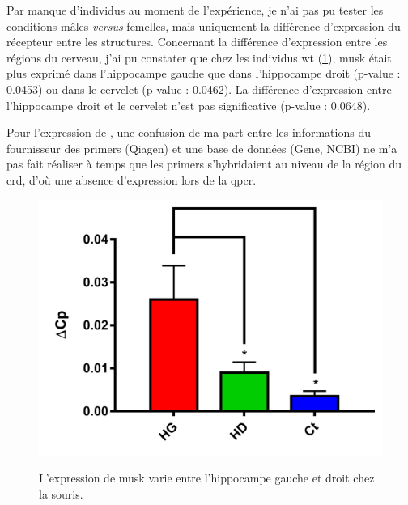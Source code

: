 	Par manque d'individus au moment de l'expérience, je n'ai pas pu tester les conditions mâles \emph{versus} femelles, mais uniquement la différence d'expression du récepteur entre les structures. Concernant la différence d'expression entre les régions du cerveau, j'ai pu constater que chez les individus \gls{wt} (\cref{fig:qPCRCompaWT}), \gls{musk} était plus exprimé dans l'hippocampe gauche que dans l'hippocampe droit (p-value : 0.0453) ou dans le cervelet (p-value : 0.0462). La différence d'expression entre l'hippocampe droit et le cervelet n'est pas significative (p-value : 0.0648).
	
	Pour l'expression de \mcrd, une confusion de ma part entre les informations du fournisseur des primers (Qiagen\texttrademark) et une base de données (Gene, NCBI) ne m'a pas fait réaliser à temps que les primers s'hybridaient au niveau de la région du \gls{crd}, d'où une absence d'expression lors de la \gls{qpcr}. 
	
	\begin{figure}[h]
		\begin{minipage}{0.5\textwidth}
			\includegraphics[width=\textwidth]{./Images/qPCR/Comp_Struct_WT.jpg}
		\end{minipage}%
		\begin{minipage}{0.5\textwidth}
			\caption{L'expression de \gls{musk} varie entre l'hippocampe gauche et droit chez la souris.}
			\label{fig:qPCRCompaWT}
		\end{minipage}%
	\end{figure}

